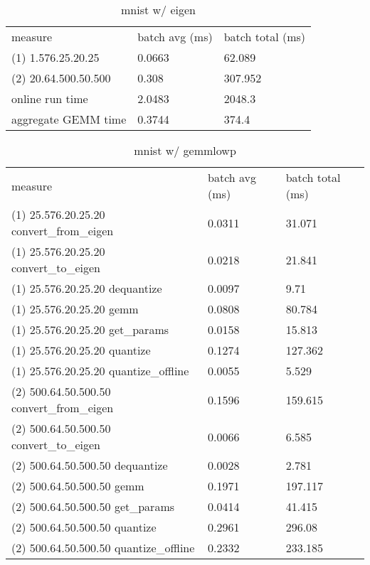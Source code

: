 \begin{longtable}{lll}
\caption{mnist w/ eigen}\\
measure              & batch avg (ms) & batch total (ms) \\
(1) 1.576.25.20.25   & 0.0663         & 62.089           \\
(2) 20.64.500.50.500 & 0.308          & 307.952          \\
online run time      & 2.0483         & 2048.3           \\
aggregate GEMM time  & 0.3744         & 374.4           
\end{longtable}

\begin{longtable}{lll}
\caption{mnist w/ gemmlowp}\\
measure                                   & batch avg (ms) & batch total (ms) \\
(1) 25.576.20.25.20 convert\_from\_eigen  & 0.0311         & 31.071           \\
(1) 25.576.20.25.20 convert\_to\_eigen    & 0.0218         & 21.841           \\
(1) 25.576.20.25.20 dequantize            & 0.0097         & 9.71             \\
(1) 25.576.20.25.20 gemm                  & 0.0808         & 80.784           \\
(1) 25.576.20.25.20 get\_params           & 0.0158         & 15.813           \\
(1) 25.576.20.25.20 quantize              & 0.1274         & 127.362          \\
(1) 25.576.20.25.20 quantize\_offline     & 0.0055         & 5.529            \\
(2) 500.64.50.500.50 convert\_from\_eigen & 0.1596         & 159.615          \\
(2) 500.64.50.500.50 convert\_to\_eigen   & 0.0066         & 6.585            \\
(2) 500.64.50.500.50 dequantize           & 0.0028         & 2.781            \\
(2) 500.64.50.500.50 gemm                 & 0.1971         & 197.117          \\
(2) 500.64.50.500.50 get\_params          & 0.0414         & 41.415           \\
(2) 500.64.50.500.50 quantize             & 0.2961         & 296.08           \\
(2) 500.64.50.500.50 quantize\_offline    & 0.2332         & 233.185          \\

\end{longtable}
